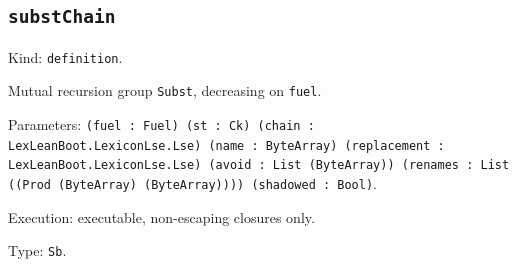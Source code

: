 \documentclass[11pt]{article}
\begin{document}
\subsection*{\texttt{substChain}}
\noindent Kind: \texttt{definition}.\par
\noindent Mutual recursion group \texttt{Subst}, decreasing on \texttt{fuel}.\par
\noindent Parameters: \texttt{(fuel : Fuel) (st : Ck) (chain : LexLeanBoot.LexiconLse.Lse) (name : ByteArray) (replacement : LexLeanBoot.LexiconLse.Lse) (avoid : List (ByteArray)) (renames : List ((Prod (ByteArray) (ByteArray)))) (shadowed : Bool)}.\par
\noindent Execution: executable, non-escaping closures only.\par
\noindent Type: \texttt{Sb}.\par
\end{document}
